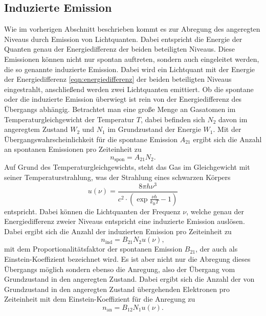 \subsection{Induzierte Emission}
\label{sec:emission}
Wie im vorherigen Abschnitt beschrieben kommt es zur Abregung des angeregten
Niveaus durch Emission von Lichtquanten. Dabei entspricht die Energie der Quanten genau der 
Energiedifferenz der beiden beteiligten Niveaus. Diese Emissionen können nicht nur
spontan auftreten, sondern auch eingeleitet werden, die so genannte induzierte Emission.
Dabei wird ein Lichtquant mit der Energie der Energiedifferenz \eqref{eqn:energiedifferenz} der beiden beteiligten 
Niveaus eingestrahlt, anschließend werden zwei Lichtquanten emittiert. Ob die spontane
oder die induzierte Emission  überwiegt ist rein von der Energiedifferenz des Übergangs abhängig.
Betrachtet man eine große Menge an Gasatomen im Temperaturgleichgewicht der Temperatur $T$, dabei befinden 
sich $N_2$ davon im angeregtem Zustand $W_2$ und $N_1$ im Grundzustand der Energie $W_1$.
Mit der Übergangswahrscheinlichkeit für die spontane Emission $A_{21}$ ergibt sich die Anzahl an 
spontanen Emissionen pro Zeiteinheit zu
\begin{equation*}
  n_\text{spon} = A_{21} N_2.
\end{equation*}
Auf Grund des Temperaturgleichgewichts, steht das Gas im Gleichgewicht mit seiner
Temperaturstrahlung, was der Strahlung eines schwarzen Körpers
\begin{equation*}
  u(\nu) = \frac{8 \pi h \nu^3}{c^2 \cdot \left(\exp{\frac{\nu h}{k_\text{B} T}} -1 \right)}
\end{equation*}
entspricht. Dabei können die Lichtquanten der Frequenz $\nu$, welche genau der Energiedifferenz zweier Niveaus entspricht
eine induzierte Emission auslösen. Dabei ergibt sich die Anzahl der induzierten Emission pro Zeiteinheit zu 
\begin{equation*}
  n_\text{ind} = B_{21} N_2 u(\nu),
\end{equation*}
mit dem Proportionalitätsfaktor der spontanen Emission $B_{21}$, der auch als Einstein-Koeffizient bezeichnet wird.
Es ist aber nicht nur die Abregung dieses Übergangs möglich sondern ebenso die Anregung, also der Übergang
vom Grundzustand in den angeregten Zustand. Dabei ergibt sich die Anzahl der von Grundzustand in den angeregten Zustand
übergehenden Elektronen pro Zeiteinheit mit dem Einstein-Koeffizient für die Anregung zu
\begin{equation*}
  n_\text{an} = B_{12} N_1 u(\nu).
\end{equation*}
